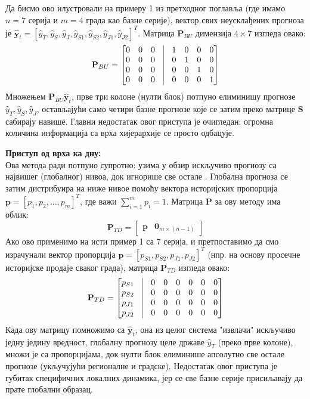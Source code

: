 \documentclass[12pt,oneside]{memoir}
\begin{document}
Да бисмо ово илустровали на примеру 1 из претходног поглавља (где имамо $n=7$ серија и $m=4$ града као базне серије), вектор свих неусклађених прогноза је $\hat{\mathbf{y}}_t = [\hat{y}_T, \hat{y}_S, \hat{y}_J, \hat{y}_{S1}, \hat{y}_{S2}, \hat{y}_{J1}, \hat{y}_{J2}]^T$. Матрица $\mathbf{P}_{BU}$ димензија $4 \times 7$ изгледа овако:
\begin{equation}
    \mathbf{P}_{BU} = 
    \begin{bmatrix}
    0 & 0 & 0 & \vline & 1 & 0 & 0 & 0 \\
    0 & 0 & 0 & \vline & 0 & 1 & 0 & 0 \\
    0 & 0 & 0 & \vline & 0 & 0 & 1 & 0 \\
    0 & 0 & 0 & \vline & 0 & 0 & 0 & 1
    \end{bmatrix}
\end{equation}
Множењем $\mathbf{P}_{BU} \hat{\mathbf{y}}_t$, прве три колоне (нулти блок) потпуно елиминишу прогнозе $\hat{y}_T, \hat{y}_S, \hat{y}_J$, остављајући само четири базне прогнозе које се затим преко матрице $\mathbf{S}$ сабирају навише. Главни недостатак овог приступа је очигледан: огромна количина информација са врха хијерархије се просто одбацује.

\vspace{1em}
\noindent \textbf{Приступ од врха ка дну:} \\
Ова метода ради потпуно супротно: узима у обзир искључиво прогнозу са највишег (глобалног) нивоа, док игнорише све остале \cite{gross1990disaggregation}. Глобална прогноза се затим дистрибуира на ниже нивое помоћу вектора историјских пропорција $\mathbf{p} = [p_1, p_2, \dots, p_m]^T$, где важи $\sum_{i=1}^{m} p_i = 1$. Матрица $\mathbf{P}$ за ову методу има облик:
\begin{equation}
    \mathbf{P}_{TD} = \begin{bmatrix} \mathbf{p} & \mathbf{0}_{m \times (n-1)} \end{bmatrix}
\end{equation}
Ако ово применимо на исти пример 1 са 7 серија, и претпоставимо да смо израчунали вектор пропорција $\mathbf{p} = [p_{S1}, p_{S2}, p_{J1}, p_{J2}]^T$ (нпр. на основу просечне историјске продаје сваког града), матрица $\mathbf{P}_{TD}$ изгледа овако:
\begin{equation}
    \mathbf{P}_{TD} = 
    \begin{bmatrix}
    p_{S1} & \vline & 0 & 0 & 0 & 0 & 0 & 0 \\
    p_{S2} & \vline & 0 & 0 & 0 & 0 & 0 & 0 \\
    p_{J1} & \vline & 0 & 0 & 0 & 0 & 0 & 0 \\
    p_{J2} & \vline & 0 & 0 & 0 & 0 & 0 & 0
    \end{bmatrix}
\end{equation}
Када ову матрицу помножимо са $\hat{\mathbf{y}}_t$, она из целог система "извлачи" искључиво једну једину вредност, глобалну прогнозу целе државе $\hat{y}_T$ (преко прве колоне), множи је са пропорцијама, док нулти блок елиминише апсолутно све остале прогнозе (укључујући регионалне и градске). Недостатак овог приступа је губитак специфичних локалних динамика, јер се све базне серије присиљавају да прате глобални образац.
\end{document}
